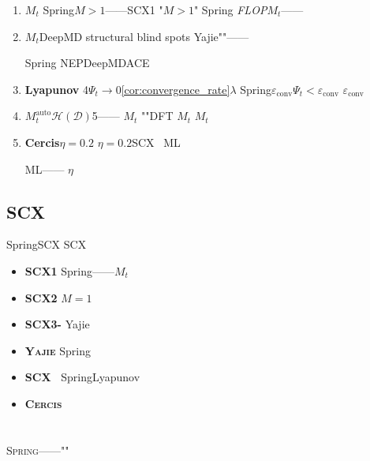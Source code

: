 \documentclass[12pt,a4paper]{article}
\theoremstyle{remark}
\newcommand{\D}{\mathcal{D}}
\newcommand{\Spring}{\textsc{Spring}}
\newcommand{\Yajie}{\textsc{Yajie}}
\newcommand{\Cercis}{\textsc{Cercis}}
\newcommand{\Mauto}{\ensuremath{M_t^{\text{auto}}}}
\newcommand{\Lyap}{\ensuremath{\Psi}}
\newcommand{\Dhash}{\ensuremath{\mathcal{H}(\D)}}
\begin{document}
\begin{enumerate}[label=\textbf{H\arabic*},leftmargin=*,itemsep=4pt]
    \item \textbf{$M_t$}
    Spring$M>1$——SCX1
    "$M>1$"
    Spring
    \textit{FLOP}$M_t$——

    \item \textbf{}
    $M_t$DeepMD
    \textit{}structural blind spots
    Yajie""——
    
    Spring
    \textit{}NEPDeepMDACE

    \item \textbf{Lyapunov}
    4$\Lyap_t \to 0$\ref{cor:convergence_rate}$\lambda$
    Spring$\varepsilon_{\text{conv}}$$\Lyap_t < \varepsilon_{\text{conv}}$
    $\varepsilon_{\text{conv}}$
    \textit{}

    \item \textbf{}
    $\Mauto$$\Dhash$5——
    $M_t$
    ""DFT
    $M_t$
    \textit{}$M_t$

    \item \textbf{Cercis$\eta=0.2$}
    $\eta=0.2$SCX~\cite{scx_ml_audit}
    ML
    
    ML——
    $\eta$
\end{enumerate}

\subsection{SCX}

SpringSCX
SCX

\begin{itemize}[itemsep=3pt]
    \item \textbf{SCX1} Spring——$M_t$
    \item \textbf{SCX2} $M=1$
    \item \textbf{SCX3-} Yajie
    \item \textbf{\Yajie{}} Spring
    \item \textbf{SCX~\cite{scx_hamiltonian}} SpringLyapunov
    \item \textbf{\Cercis{}} 
\end{itemize}

\newpage

\section{}

\Spring{}——""
\end{document}
